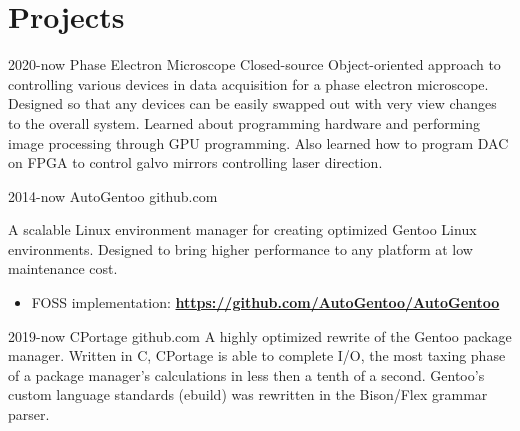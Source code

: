 \documentclass[print]{cv-style}          %
\begin{document}

{\vspace{-0.3cm}}
\section{Projects}

\begin{entrylist}
\entry
{2020-now}
{Phase Electron Microscope}
{Closed-source}
{Object-oriented approach to controlling various devices in data acquisition for a phase electron microscope. Designed so that any devices can be easily swapped out with very view changes to the overall system. Learned about programming hardware and performing image processing through GPU programming. Also learned how to program DAC on FPGA to control galvo mirrors controlling laser direction.}

\entry
{2014-now}
{AutoGentoo }
{github.com}
{A scalable Linux environment manager for creating optimized Gentoo Linux environments. Designed to bring higher performance to any platform at low maintenance cost.
\begin{itemize}
	\item FOSS implementation: \textbf{\href{https://github.com/AutoGentoo/AutoGentoo}{https://github.com/AutoGentoo/AutoGentoo}}
\end{itemize}
}

\entry
{2019-now}
{CPortage}
{github.com}
{A highly optimized rewrite of the Gentoo package manager. Written in C, CPortage is able to complete I/O, the most taxing phase of a package manager's calculations in less then a tenth of a second. Gentoo's custom language standards (ebuild) was rewritten in the Bison/Flex grammar parser.}

{\vspace{-0.3cm}}
\end{entrylist}

\newpage
\end{document}
